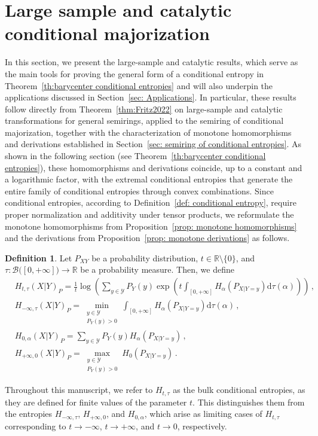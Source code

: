 \documentclass[aps,pra,11pt,onecolumn,nofootinbib,tightenlines]{revtex4-2}
\theoremstyle{definition}
\newtheorem{definition}[theorem]{Definition}
\def \d {\mathrm{d}}
\newcommand{\Y}{\mathcal{Y}}
\newcommand{\R}{\mathbb{R}}
\newcommand{\mc}[1]{\mathcal{#1}}
\newcommand{\mb}[1]{\mathbb{#1}}
\begin{document}
\section{Large sample and catalytic conditional majorization}
\label{sec: large sample}
In this section, we present the large-sample and catalytic results, which serve as the main tools for proving the general form of a conditional entropy in Theorem~\ref{th:barycenter conditional entropies} and will also underpin the applications discussed in Section~\ref{sec: Applications}.
In particular, these results follow directly from Theorem~\ref{thm:Fritz2022} on large-sample and catalytic transformations for general semirings, applied to the semiring of conditional majorization, together with the characterization of monotone homomorphisms and derivations established in Section~\ref{sec: semiring of conditional entropies}. 
As shown in the following section (see Theorem~\ref{th:barycenter conditional entropies}), these homomorphisms and derivations coincide, up to a constant and a logarithmic factor, with the extremal conditional entropies that generate the entire family of conditional entropies through convex combinations.
Since conditional entropies, according to Definition~\ref{def: conditional entropy}, require proper normalization and additivity under tensor products, we reformulate the monotone homomorphisms from Proposition~\ref{prop: monotone homomorphisms} and the derivations from Proposition~\ref{prop: monotone derivations} as follows. 



\begin{definition}
\label{def: extremal entropies}
Let $P_{XY}$ be a probability distribution, $t\in\R\setminus\{0\}$, and $\tau:\mc B\big([0,+\infty]\big)\to\mb R$ be a probability measure. Then, we define
\begin{align}
    &H_{t,\tau}(X|Y)_P = \frac{1}{t}\log \left(\sum_{y \in \Y} P_Y(y)\exp{\left(t\int_{[0,+\infty]}H_\alpha(P_{X|Y=y})\d\tau(\alpha)\right)}\right) \,, \label{eq:TempEnt}\\
    & H_{-\infty,\tau}(X|Y)_P =  \min \limits_{\substack{y \in \mathcal{Y} \\ P_Y( y) > 0}}\int_{[0,+\infty]}H_\alpha(P_{X|Y=y})\d\tau(\alpha) \,, \label{eq:TropEnt}\\
    & H_{0,\alpha}(X|Y)_P =  \sum_{y \in \Y} P_Y(y)H_\alpha(P_{X|Y=y})\,,\label{eq:DerivEnt} \\
    & H_{+\infty,0}(X|Y)_P =  \max \limits_{\substack{y \in \mathcal{Y} \\ P_Y( y) > 0}} H_0(P_{X|Y=y}) \,. \label{eq:TropEntno}
\end{align}
\end{definition}
Throughout this manuscript, we refer to \(H_{t,\tau}\) as the bulk conditional entropies, as they are defined for finite values of the parameter \(t\). This distinguishes them from the entropies \(H_{-\infty,\tau}\), \(H_{+\infty,0}\), and \(H_{0,\alpha}\), which arise as limiting cases of $H_{t,\tau}$ corresponding to \(t \to -\infty\), \(t \to +\infty\), and \(t \to 0\), respectively.
\end{document}
